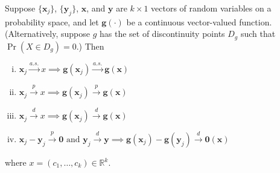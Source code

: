 \begin{theorem}\label{asym.contmappthm}Suppose \(\{\boldsymbol{x}_j\}\), \(\{\boldsymbol{y}_j\}\), \(\boldsymbol{x}\), and \(\boldsymbol{y}\) are \(k \times 1\) vectors of random variables on a probability space, and let \(\boldsymbol{g}(\cdot)\) be a continuous vector-valued function. (Alternatively, suppose \(g\) has the set of discontinuity points \(D_g\) such that \(\Pr(X \in D_g) = 0\).) Then

\begin{enumerate}[(i)]

\item \(\boldsymbol{x}_j \xrightarrow{a.s.} x \implies \boldsymbol{g}(\boldsymbol{x}_j) \xrightarrow{a.s.} \boldsymbol{g}(\boldsymbol{x})\)

\item \(\boldsymbol{x}_j \xrightarrow{p} x \implies \boldsymbol{g}(\boldsymbol{x}_j) \xrightarrow{p} \boldsymbol{g}(\boldsymbol{x})\)

\item \(\boldsymbol{x}_j \xrightarrow{d} x \implies \boldsymbol{g}(\boldsymbol{x}_j) \xrightarrow{d} \boldsymbol{g}(\boldsymbol{x})\)

\item \(\boldsymbol{x}_j  - \boldsymbol{y}_j \xrightarrow{p} \boldsymbol{0} \text{ and } \boldsymbol{y}_j \xrightarrow{d} \boldsymbol{y} \implies \boldsymbol{g}(\boldsymbol{x}_j) - \boldsymbol{g}(\boldsymbol{y}_j) \xrightarrow{d} \boldsymbol{0}(\boldsymbol{x})\)

\end{enumerate}

where \(x = (c_1, \ldots, c_k) \in \mathbb{R}^k\).

\end{theorem}

